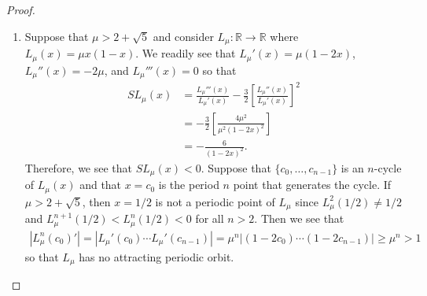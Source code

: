 \begin{proof}
\begin{enumerate}
    \item Suppose that $\mu > 2 + \sqrt{5}$ and consider $L_\mu: \mathbb{R} \to \mathbb{R}$ where $L_\mu(x) = \mu x(1 - x)$.
      We readily see that $L_\mu'(x) = \mu(1-2x)$, $L_\mu''(x)= -2\mu$, and $L_\mu'''(x) = 0$ so
      that
      \begin{align*}
        S L_\mu(x) &= \frac{L_\mu'''(x)}{L_\mu'(x)}-\frac{3}{2}\left[\frac{L_\mu''(x)}{L_\mu'(x)}\right]^2 \\
        &= -\frac{3}{2}\left[\frac{4\mu^2}{\mu^2(1-2x)^2}\right] \\
        &= -\frac{6}{(1-2x)^2}.
      \end{align*}
      Therefore, we see that $SL_\mu(x) < 0$. Suppose that $\{c_0,\dots,c_{n-1}\}$ is an $n$-cycle of $L_\mu(x)$
      and that $x=c_0$ is the period $n$ point that generates the cycle. If $\mu > 2 + \sqrt{5}$, then
      $x=1/2$ is not a periodic point of $L_\mu$ since $L_\mu^2(1/2) \neq 1/2$ and $L_\mu^{n+1}(1/2) < L_\mu^n(1/2) < 0$ for all $n > 2$.
      Then we see that
      \begin{align*}
        \left| L_\mu^n(c_0)' \right| = \left| L_\mu'(c_0) \cdots L_\mu'(c_{n-1})\right| = \mu^n \left| (1-2c_0)\cdots (1-2c_{n-1}) \right| \geq \mu^n > 1
      \end{align*}
      so that $L_\mu$ has no attracting periodic orbit.
  \end{enumerate}
\end{proof}
\newpage
